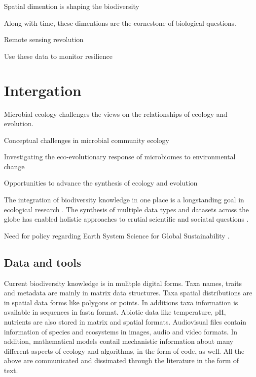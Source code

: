 Spatial dimention is shaping the biodiversity

Along with time, these dimentions are the cornestone of 
biological questions. 


Remote sensing revolution

Use these data to monitor resilience \citep{Lenton2022resilience}

\section{Intergation}
\label{sec:crete-integration}

Microbial ecology challenges the views on the relationships of ecology and evolution.

Conceptual challenges in microbial community ecology \citep{prosser2020Conceptual}

Investigating the eco-evolutionary response of microbiomes to environmental change \citep{martiny2023Investigating}

Opportunities to advance the synthesis of ecology and evolution \citep{loreau2023Opportunities}


The integration of biodiversity knowledge in one place is a longstanding
goal in ecological research \citep{Walter_2012}. The synthesis of multiple
data types and datasets across the globe has enabled 
holistic approaches to crutial scientific and sociatal questions \citep{heberling_j_mason_data_2021}.

Need for policy regarding Earth System Science for Global
Sustainability \citep{reid2010earth}.

\subsection{Data and tools}
\label{sec:data-tools}

Current biodiversity knowledge is in mulitple digital forms. 
Taxa names, traits and metadata are mainly in matrix data
structures. Taxa spatial distributions are in spatial data
forms like polygons or points. In additions taxa information
is available in sequences in fasta format. Abiotic data like 
temperature, pH, nutrients are also stored in matrix
and spatial formats. Audiovisual files contain information
of species and ecosystems in images, audio and video formats.
In addition, mathematical models contail mechanistic information
about many different aspects of ecology and algorithms, in the 
form of code, as well. All the above are communicated and dissimated through the
literature in the form of text.

